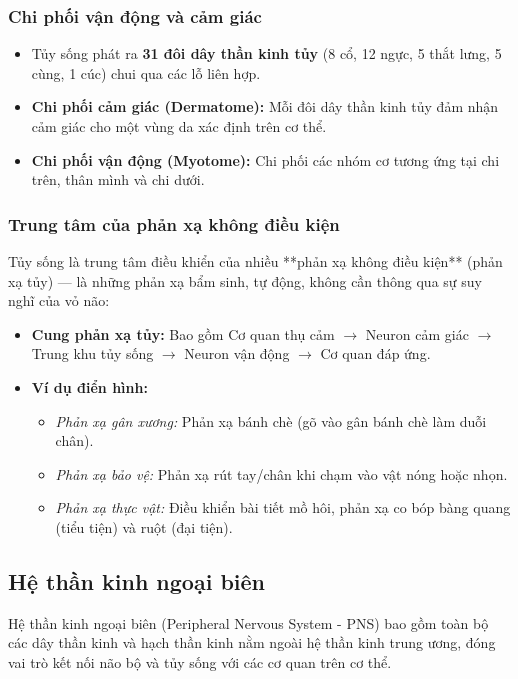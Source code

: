 \subsubsection{Chi phối vận động và cảm giác}
\begin{itemize}
    \item Tủy sống phát ra \textbf{31 đôi dây thần kinh tủy} (8 cổ, 12 ngực, 5 thắt lưng, 5 cùng, 1 cúc) chui qua các lỗ liên hợp.
    \item \textbf{Chi phối cảm giác (Dermatome):} Mỗi đôi dây thần kinh tủy đảm nhận cảm giác cho một vùng da xác định trên cơ thể.
    \item \textbf{Chi phối vận động (Myotome):} Chi phối các nhóm cơ tương ứng tại chi trên, thân mình và chi dưới.
\end{itemize}

\subsubsection{Trung tâm của phản xạ không điều kiện}
Tủy sống là trung tâm điều khiển của nhiều **phản xạ không điều kiện** (phản xạ tủy) — là những phản xạ bẩm sinh, tự động, không cần thông qua sự suy nghĩ của vỏ não:
\begin{itemize}
    \item \textbf{Cung phản xạ tủy:} Bao gồm Cơ quan thụ cảm $\rightarrow$ Neuron cảm giác $\rightarrow$ Trung khu tủy sống $\rightarrow$ Neuron vận động $\rightarrow$ Cơ quan đáp ứng.
    \item \textbf{Ví dụ điển hình:}
    \begin{itemize}
        \item \textit{Phản xạ gân xương:} Phản xạ bánh chè (gõ vào gân bánh chè làm duỗi chân).
        \item \textit{Phản xạ bảo vệ:} Phản xạ rút tay/chân khi chạm vào vật nóng hoặc nhọn.
        \item \textit{Phản xạ thực vật:} Điều khiển bài tiết mồ hôi, phản xạ co bóp bàng quang (tiểu tiện) và ruột (đại tiện).
    \end{itemize}
\end{itemize}

\subsection{Hệ thần kinh ngoại biên}

Hệ thần kinh ngoại biên (Peripheral Nervous System - PNS) bao gồm toàn bộ các dây thần kinh và hạch thần kinh nằm ngoài hệ thần kinh trung ương, đóng vai trò kết nối não bộ và tủy sống với các cơ quan trên cơ thể.

